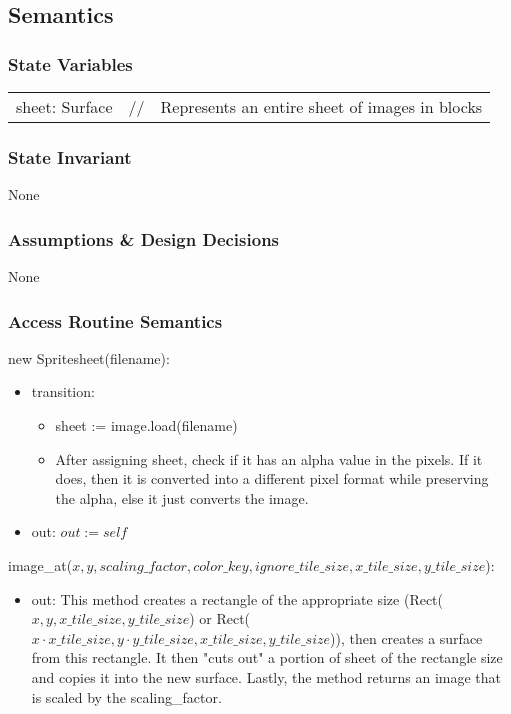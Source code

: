 \documentclass[12pt]{article}
\begin{document}
\subsection* {Semantics}

\subsubsection* {State Variables}

\begin{tabular}{lll}
    sheet: Surface & // & Represents an entire sheet of images in blocks\\ 
\end{tabular}
\subsubsection* {State Invariant}
None

\subsubsection* {Assumptions \& Design Decisions}
None

\subsubsection* {Access Routine Semantics}

new Spritesheet(filename):
\begin{itemize}
\item transition:
    \begin{itemize}[]
        \item sheet := image.load(filename)
        \item After assigning sheet, check if it has an alpha value in the pixels. If it does, then it is converted into a different pixel format while preserving the alpha, else it just converts the image.
    \end{itemize}
\item out: $out := self$
\end{itemize}

\noindent image\_at($x, y, scaling\_factor, color\_key, ignore\_tile\_size, x\_tile\_size, y\_tile\_size$):
\begin{itemize}
\item out: This method creates a rectangle of the appropriate size (Rect($x, y, x\_tile\_size, y\_tile\_size$) or Rect($x \cdot x\_tile\_size, y \cdot y\_tile\_size, x\_tile\_size, y\_tile\_size$)), then creates a surface from this rectangle. It then "cuts out" a portion of sheet of the rectangle size and copies it into the new surface. Lastly, the method returns an image that is scaled by the scaling\_factor.
\end{itemize}
\end{document}
